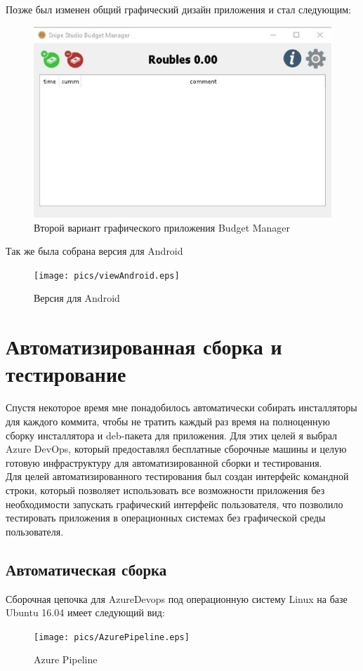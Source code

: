Позже был изменен общий графический дизайн приложения 	и стал следующим:

\begin{figure}[H]
	\centering
	\includegraphics[width=0.7\linewidth]{pics/view2.eps}
	\caption{Второй вариант графического приложения Budget Manager}
	\label{fig:view2}
\end{figure}

Так же была собрана версия для Android

\begin{figure}[H]
	\centering
	
	\texttt{[image: pics/viewAndroid.eps]}
	\caption{Версия для Android}
	\label{fig:viewAndroid}
\end{figure}

\section{Автоматизированная сборка и тестирование}
Спустя некоторое время мне понадобилось автоматически собирать инсталляторы для каждого коммита, чтобы не тратить каждый раз время на полноценную сборку инсталлятора и deb-пакета для приложения. Для этих целей я выбрал Azure DevOps, который предоставлял бесплатные сборочные машины и целую готовую инфраструктуру для автоматизированной сборки и тестирования.\\
Для целей автоматизированного тестирования был создан интерфейс командной строки, который позволяет использовать все возможности приложения без необходимости запускать графический интерфейс пользователя, что позволило тестировать приложения в операционных системах без графической среды пользователя.\\
\subsection{Автоматическая сборка}
Сборочная цепочка для AzureDevops под операционную систему Linux на базе Ubuntu 16.04 имеет следующий вид:
\begin{figure}[H]
	\centering
	\texttt{[image: pics/AzurePipeline.eps]}
	\caption{Azure Pipeline}
	\label{fig:AzurePipeline}
\end{figure}

